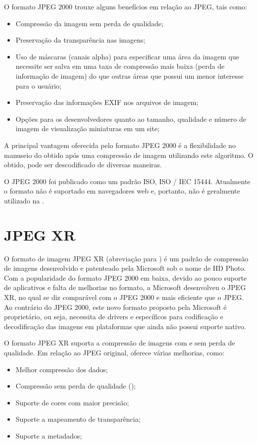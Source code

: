 \documentclass[espaco=simples,appendix=Name]{abnt}
\begin{document}
O formato JPEG 2000 trouxe alguns benefícios em relação ao JPEG, tais como:
\begin{itemize}
	\item Compressão da imagem sem perda de qualidade;
	\item Preservação da transparência nas imagens;
	\item Uso de máscaras (canais alpha) para especificar uma área da imagem que necessite ser salva em uma taxa de compressão mais baixa (perda de informação de imagem) do que outras áreas que possui um menor interesse para o usuário;
	\item Preservação das informações EXIF nos arquivos de imagem;
	\item Opções para os desenvolvedores quanto ao tamanho, qualidade e número de imagem de visualização miniaturas em um site;
\end{itemize}

A principal vantagem oferecida pelo formato JPEG 2000 é a flexibilidade no manuseio do  obtido após uma compressão de imagem utilizando este algoritmo. O  obtido, pode ser descodificado de diversas maneiras. \cite{JPEG2000Codestreams}

O JPEG 2000 foi publicado como um padrão ISO, ISO / IEC 15444. Atualmente o formato não é suportado em navegadores web e, portanto, não é geralmente utilizado na .\cite{JPEG}

\section{JPEG XR}

O formato de imagem JPEG XR (abreviação para ) é um padrão de compressão de imagens desenvolvido e patenteado pela Microsoft sob o nome de HD Photo.
Com a popularidade do formato JPEG 2000 em baixa, devido ao pouco suporte de aplicativos e falta de melhorias no formato, a Microsoft desenvolveu o JPEG XR, no qual se diz comparável com o JPEG 2000 e mais eficiente que o JPEG. Ao contrário do JPEG 2000, este novo formato proposto pela Microsoft é proprietário, ou seja, necessita de drivers e  específicos para codificação e decodificação das imagens em plataformas que ainda não possui suporte nativo.

O formato JPEG XR suporta a compressão de imagens com e sem perda de qualidade. Em relação ao JPEG original, oferece várias melhorias, como:
\begin{itemize}
	\item Melhor compressão dos dados;
	\item Compressão sem perda de qualidade ();
	\item Suporte de cores com maior precisão;
	\item Suporte a  mapeamento de transparência;
	\item Suporte a metadados;
\end{itemize}
\end{document}
